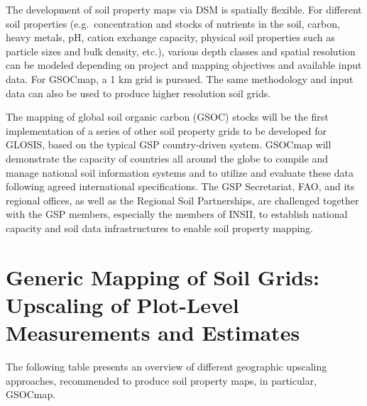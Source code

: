 \documentclass[10pt,b5paper,]{book}
\theoremstyle{definition}
\theoremstyle{definition}
\theoremstyle{definition}
\theoremstyle{remark}
\begin{document}
The development of soil property maps via DSM is spatially flexible. For
different soil properties (e.g.~concentration and stocks of nutrients in
the soil, carbon, heavy metals, pH, cation exchange capacity, physical
soil properties such as particle sizes and bulk density, etc.), various
depth classes and spatial resolution can be modeled depending on project
and mapping objectives and available input data. For GSOCmap, a 1 km
grid is pursued. The same methodology and input data can also be used to
produce higher resolution soil grids.

The mapping of global soil organic carbon (GSOC) stocks will be the
first implementation of a series of other soil property grids to be
developed for GLOSIS, based on the typical GSP country-driven system.
GSOCmap will demonstrate the capacity of countries all around the globe
to compile and manage national soil information systems and to utilize
and evaluate these data following agreed international specifications.
The GSP Secretariat, FAO, and its regional offices, as well as the
Regional Soil Partnerships, are challenged together with the GSP
members, especially the members of INSII, to establish national capacity
and soil data infrastructures to enable soil property mapping.

\hypertarget{generic-mapping-of-soil-grids-upscaling-of-plot-level-measurements-and-estimates}{%
\section{Generic Mapping of Soil Grids: Upscaling of Plot-Level
Measurements and
Estimates}\label{generic-mapping-of-soil-grids-upscaling-of-plot-level-measurements-and-estimates}}

The following table presents an overview of different geographic
upscaling approaches, recommended to produce soil property maps, in
particular, GSOCmap.
\end{document}
